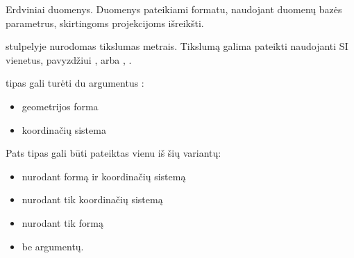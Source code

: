 \documentclass[letterpaper,10pt,lithuanian]{sphinxmanual}
\begin{document}
\begin{fulllineitems}
\label{\detokenize{tipai:type.geometry}}
\pysigstartsignatures
{}
\pysigstopsignatures
\sphinxAtStartPar
Erdviniai duomenys. Duomenys pateikiami  formatu, naudojant 
duomenų bazės parametrus, skirtingoms projekcijoms išreikšti.

\sphinxAtStartPar
{\hyperref[\detokenize{dimensijos:property.ref}]{}} stulpelyje nurodomas tikslumas metrais. Tikslumą
galima pateikti naudojanti SI vienetus, pavyzdžiui ,  arba ,
.

\sphinxAtStartPar
{} tipas gali turėti du argumentus :
\begin{itemize}
\item {} 
\sphinxAtStartPar
{} \sphinxhyphen{} geometrijos forma

\item {} 
\sphinxAtStartPar
{} \sphinxhyphen{} koordinačių sistema

\end{itemize}

\sphinxAtStartPar
Pats tipas gali būti pateiktas vienu iš šių variantų:
\begin{itemize}
\item {} 
\sphinxAtStartPar
{} \sphinxhyphen{} nurodant formą ir koordinačių sistemą

\item {} 
\sphinxAtStartPar
{} \sphinxhyphen{} nurodant tik koordinačių sistemą

\item {} 
\sphinxAtStartPar
{} \sphinxhyphen{} nurodant tik formą

\item {} 
\sphinxAtStartPar
{} \sphinxhyphen{} be argumentų.

\end{itemize}


\end{fulllineitems}
\end{document}
